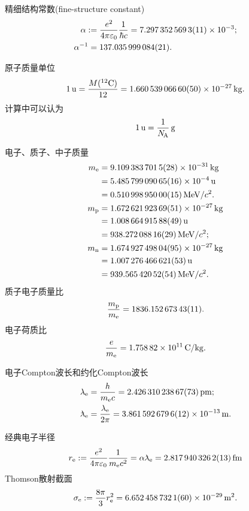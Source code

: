 精细结构常数(fine-structure constant)
\begin{align}
	\alpha:={}&\frac{e^2}{4\pi\varepsilon_0}\frac1{\hbar c}=\num{7.2973525693(11)E-3};\\
	\alpha^{-1}={}&\num{137.035999084(21)}.
\end{align}

原子质量单位
\begin{align}
	\SI{1}{u}=\frac{M(\nucli{12}{C})}{12}=\SI{1.66053906660(50)E-27}{kg}.
\end{align}
计算中可以认为
\[
	\SI{1}{u}=\frac1{\NA}\,\si{g}
\]

电子、质子、中子质量
\begin{align}
	m_\elc&=\SI{9.1093837015(28)E-31}{kg}\\
	&=\SI{5.48579909065(16)E-4}{u}\\
	&=\SI{0.51099895000(15)}{MeV}/c^2.\\
	m_\pton&=\SI{1.67262192369(51)E-27}{kg}\\
	&=\SI{1.00866491588(49)}{u}\\
	&=\SI{938.27208816(29)}{MeV}/c^2;\\
	m_\nton&=\SI{1.67492749804(95)E-27}{kg}\\
	&=\SI{1.007276466621(53)}{u}\\
	&=\SI{939.56542052(54)}{MeV}/c^2.
\end{align}
质子电子质量比
\begin{align}
	\frac{m_\pton}{m_\elc}=\num{1836.15267343(11)}.
\end{align}
电子荷质比
\begin{align}
	\frac e{m_\elc}=\SI{1.75882E11}{C/kg}.
\end{align}

电子Compton波长和约化Compton波长
\begin{align}
	\lambda_\elc&=\frac h{m_\elc c}=\SI{2.42631023867(73)}{pm};\\
	\lambdabar_\elc&=\frac{\lambda_\elc}{2\pi}=\SI{3.861 592 6796(12)E-13}{m}.
\end{align}

经典电子半径
\begin{align}
	r_\elc:=\frac{e^2}{4\pi\varepsilon_0}\frac1{m_\elc c^2}=\alpha\lambdabar_\elc=\SI{2.8179403262(13)}{fm}
\end{align}
Thomson散射截面
\begin{align}
	\sigma_\elc:=\frac{8\pi}3r_\elc^2=\SI{6.6524587321(60)E-29}{m^2}.
\end{align}



